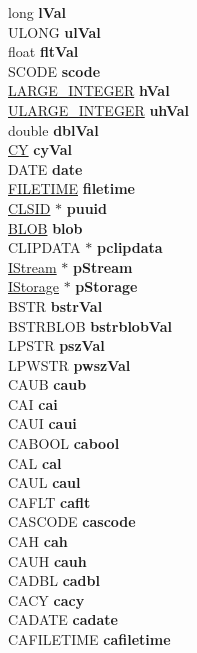 \begin{DoxyCompactItemize}
\begin{tabbing}
\>long {\bfseries lVal}\\
\>ULONG {\bfseries ulVal}\\
\>float {\bfseries fltVal}\\
\>SCODE {\bfseries scode}\\
\>\hyperlink{union___l_a_r_g_e___i_n_t_e_g_e_r}{LARGE\_INTEGER} {\bfseries hVal}\\
\>\hyperlink{struct___u_l_a_r_g_e___i_n_t_e_g_e_r}{ULARGE\_INTEGER} {\bfseries uhVal}\\
\>double {\bfseries dblVal}\\
\>\hyperlink{uniontag_c_y}{CY} {\bfseries cyVal}\\
\>DATE {\bfseries date}\\
\>\hyperlink{struct___f_i_l_e_t_i_m_e}{FILETIME} {\bfseries filetime}\\
\>\hyperlink{struct___i_i_d}{CLSID} $\ast$ {\bfseries puuid}\\
\>\hyperlink{struct___b_l_o_b}{BLOB} {\bfseries blob}\\
\>CLIPDATA $\ast$ {\bfseries pclipdata}\\
\>\hyperlink{interface_i_stream}{IStream} $\ast$ {\bfseries pStream}\\
\>\hyperlink{interface_i_storage}{IStorage} $\ast$ {\bfseries pStorage}\\
\>BSTR {\bfseries bstrVal}\\
\>BSTRBLOB {\bfseries bstrblobVal}\\
\>LPSTR {\bfseries pszVal}\\
\>LPWSTR {\bfseries pwszVal}\\
\>CAUB {\bfseries caub}\\
\>CAI {\bfseries cai}\\
\>CAUI {\bfseries caui}\\
\>CABOOL {\bfseries cabool}\\
\>CAL {\bfseries cal}\\
\>CAUL {\bfseries caul}\\
\>CAFLT {\bfseries caflt}\\
\>CASCODE {\bfseries cascode}\\
\>CAH {\bfseries cah}\\
\>CAUH {\bfseries cauh}\\
\>CADBL {\bfseries cadbl}\\
\>CACY {\bfseries cacy}\\
\>CADATE {\bfseries cadate}\\
\>CAFILETIME {\bfseries cafiletime}\\

\end{tabbing}
\end{DoxyCompactItemize}

